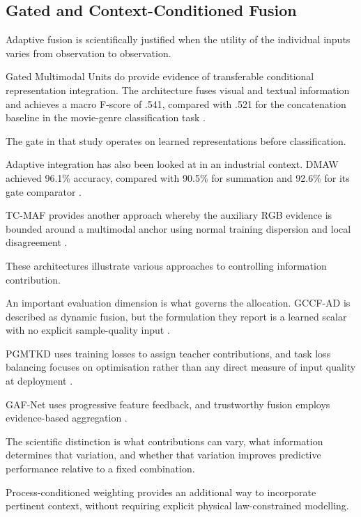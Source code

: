 \subsection{Gated and Context-Conditioned Fusion}

Adaptive fusion is scientifically justified when the utility of the individual inputs varies from
observation to observation.

Gated Multimodal Units do provide evidence of transferable conditional representation integration.
The architecture fuses visual and textual information and achieves a macro F-score of .541, compared
with .521 for the concatenation baseline in the movie-genre classification task \parencite[Section~3.1, Table~2]{arevalo_gated_2017}.

The gate in that study operates on learned representations before classification.

Adaptive integration has also been looked at in an industrial context. DMAW achieved 96.1\%
accuracy, compared with 90.5\% for summation and 92.6\% for its gate comparator \parencite[Table~V]{fan_dmaw_2026}.

TC-MAF provides another approach whereby the auxiliary RGB evidence is bounded around a multimodal
anchor using normal training dispersion and local disagreement \parencite[pp.~3--5]{deng_tc-maf_2026}.

These architectures illustrate various approaches to controlling information contribution.

An important evaluation dimension is what governs the allocation. GCCF-AD is described as dynamic
fusion, but the formulation they report is a learned scalar with no explicit sample-quality input
\parencite[p.~149226, Equation~8]{an_geometry-guided_2026}.

PGMTKD uses training losses to assign teacher contributions, and task loss balancing focuses on
optimisation rather than any direct measure of input quality at deployment
\parencite{li_pgmtkd_2025,zhang_tool_2026}.

GAF-Net uses progressive feature feedback, and trustworthy fusion employs evidence-based aggregation
\parencite{huang_rolling_2026,ying_trustworthy_2025}.

The scientific distinction is what contributions can vary, what information determines that
variation, and whether that variation improves predictive performance relative to a fixed
combination.

Process-conditioned weighting provides an additional way to incorporate pertinent context, without
requiring explicit physical law-constrained modelling.

